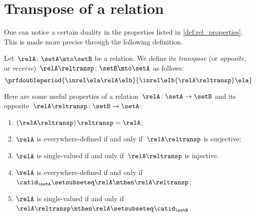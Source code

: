
\section{Transpose of a relation}

One can notice a certain duality in the properties listed in \cref{def:rel_properties}.
This is made more precise through the following definition.

\begin{ctdefinition}
    \label{def:relation-transpose}
    Let~$\relA\colon \setA\mto \setB$ be a relation.
    We define its \emph{transpose} (or \emph{opposite}, or \emph{reverse})~$\relA\reltransp\colon \setB \mto \setA$ as follows:
    \begin{equation}
        \prfdoubleperiod{
            \inrel \ela \relA \elb
        }{
            \inrel \elb {\relA\reltransp} \ela
        }
    \end{equation}
\end{ctdefinition}
\begin{remark}
    \label{re:rel-op-properties}
    Here are some useful properties of a relation~$\relA\colon \setA\to \setB$  and its opposite~$\relA\reltransp\colon \setB\to \setA$:
    \begin{enumerate}
        \item $\left(\relA\reltransp\right)\reltransp = \relA $;
        \item $\relA$ is everywhere-defined if and only if~$\relA\reltransp$ is surjective;
        \item $\relA$ is single-valued if and only if~$\relA\reltransp$ is injective.
        \item $\relA$ is everywhere-defined if and only if~$\catid_\setA\setsubseteq \relA \mthen \relA\reltransp$;
        \item $\relA$ is single-valued if and only if~$\relA\reltransp\mthen \relA\setsubseteq \catid_\setB$.
    \end{enumerate}
\end{remark}

\begin{marginfigure}
    \centering
    \caption{}
    \label{fig:rel_transpose}
\end{marginfigure}

